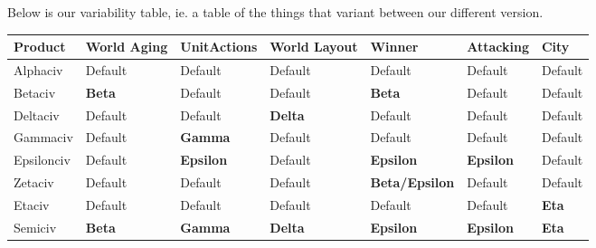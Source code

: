 Below is our variability table, ie. a table of the things that variant between
our different version.

\begin{center}
    \begin{tabular}{|l||l|l|l|l|l|l|}
        \hline
        Product    & World Aging & UnitActions   & World Layout & Winner             & Attacking       & City      \\ 
        \hline \hline
        Alphaciv   & Default     & Default       & Default      & Default            & Default         & Default   \\ 
        Betaciv    & {\bf Beta}  & Default       & Default      & {\bf Beta}         & Default         & Default   \\
        Deltaciv   & Default     & Default       & {\bf Delta}  & Default            & Default         & Default   \\
        Gammaciv   & Default     & {\bf Gamma}   & Default      & Default            & Default         & Default   \\ 
        Epsilonciv & Default     & {\bf Epsilon} & Default      & {\bf Epsilon}      & {\bf Epsilon}   & Default   \\
        Zetaciv    & Default     & Default       & Default      & {\bf Beta/Epsilon} & Default         & Default   \\
        Etaciv     & Default     & Default       & Default      & Default            & Default         & {\bf Eta} \\ 
        \hline
        Semiciv    & {\bf Beta}  & {\bf Gamma}   & {\bf Delta}  & {\bf Epsilon}      & {\bf Epsilon}   & {\bf Eta} \\
        \hline
    \end{tabular}
\end{center}

